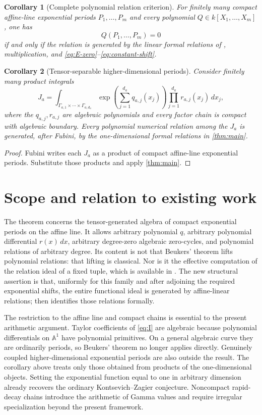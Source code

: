 \documentclass[11pt]{article}
\numberwithin{equation}{section}
\newtheorem{corollary}[corollary]{Corollary}
\theoremstyle{definition}
\theoremstyle{remark}
\newcommand{\Aone}{\mathbb A^1}
\begin{document}
\begin{corollary}[Complete polynomial relation criterion]
For finitely many compact affine-line exponential periods
$P_1,\ldots,P_m$ and every polynomial
$Q\in k[X_1,\ldots,X_m]$, one has
\[
  Q(P_1,\ldots,P_m)=0
\]
if and only if the relation is generated by the linear formal relations of
\cite{LongLinearKZ}, multiplication, and
\eqref{eq:E-zero}--\eqref{eq:constant-shift}.
\end{corollary}

\begin{corollary}[Tensor-separable higher-dimensional periods]
\label{cor:tensor-separable}
Consider finitely many product integrals
\[
  J_a=
  \int_{\Gamma_{a,1}\times\cdots\times\Gamma_{a,d_a}}
  \exp\!\left(\sum_{j=1}^{d_a}q_{a,j}(x_j)\right)
  \prod_{j=1}^{d_a}r_{a,j}(x_j)\,dx_j,
\]
where the $q_{a,j},r_{a,j}$ are algebraic polynomials and every factor chain
is compact with algebraic boundary.  Every polynomial numerical relation
among the $J_a$ is generated, after Fubini, by the one-dimensional formal
relations in \cref{thm:main}.
\end{corollary}

\begin{proof}
Fubini writes each $J_a$ as a product of compact affine-line exponential
periods.  Substitute those products and apply \cref{thm:main}.
\end{proof}

\section{Scope and relation to existing work}\label{sec:scope}

The theorem concerns the tensor-generated algebra of compact exponential
periods on the affine line.  It allows arbitrary polynomial $q$, arbitrary
polynomial differential $r(x)\,dx$, arbitrary degree-zero algebraic
zero-cycles, and polynomial relations of arbitrary degree.  Its content is
not that Beukers' theorem lifts polynomial relations: that lifting is
classical.  Nor is it the effective computation of the relation ideal of a
fixed tuple, which is available in \cite{FischlerRivoalEffective}.  The new
structural assertion is that, uniformly for this family and after adjoining
the required exponential shifts, the entire functional ideal is generated by
affine-linear relations; \cite{LongLinearKZ} then identifies those relations
formally.

The restriction to the affine line and compact chains is essential to the
present arithmetic argument.  Taylor coefficients of \eqref{eq:I} are
algebraic because polynomial differentials on $\Aone$ have polynomial
primitives.  On a general algebraic curve they are ordinarily periods, so
Beukers' theorem no longer applies directly.  Genuinely coupled
higher-dimensional exponential periods are also outside the result.  The
corollary above treats only those obtained from products of the one-dimensional
objects.  Setting the exponential function equal to one in arbitrary
dimension already recovers the ordinary Kontsevich--Zagier conjecture.
Noncompact rapid-decay chains introduce the arithmetic of Gamma values and
require irregular specialization beyond the present framework.
\end{document}
